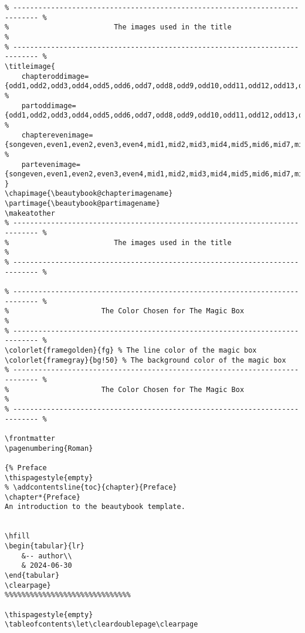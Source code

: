 \documentclass[lang=en,12pt]{beautybook}
\begin{document}
\begin{lstlisting}
% ---------------------------------------------------------------------------- %
%                         The images used in the title                         %
% ---------------------------------------------------------------------------- %
\titleimage{
    chapteroddimage={odd1,odd2,odd3,odd4,odd5,odd6,odd7,odd8,odd9,odd10,odd11,odd12,odd13,odd14,odd15,mid1,mid2,mid3,mid4,mid5,mid6,mid7,mid8,mid9,mid10,mid11},
%
    partoddimage={odd1,odd2,odd3,odd4,odd5,odd6,odd7,odd8,odd9,odd10,odd11,odd12,odd13,odd14,odd15,mid1,mid2,mid3,mid4,mid5,mid6,mid7,mid8,mid9,mid10,mid11},
%
    chapterevenimage={songeven,even1,even2,even3,even4,mid1,mid2,mid3,mid4,mid5,mid6,mid7,mid8,mid9,mid10,mid11},
%
    partevenimage={songeven,even1,even2,even3,even4,mid1,mid2,mid3,mid4,mid5,mid6,mid7,mid8,mid9,mid10,mid11},
}
\chapimage{\beautybook@chapterimagename}
\partimage{\beautybook@partimagename}
\makeatother
% ---------------------------------------------------------------------------- %
%                         The images used in the title                         %
% ---------------------------------------------------------------------------- %

% ---------------------------------------------------------------------------- %
%                      The Color Chosen for The Magic Box                      %
% ---------------------------------------------------------------------------- %
\colorlet{framegolden}{fg} % The line color of the magic box
\colorlet{framegray}{bg!50} % The background color of the magic box
% ---------------------------------------------------------------------------- %
%                      The Color Chosen for The Magic Box                      %
% ---------------------------------------------------------------------------- %

\frontmatter
\pagenumbering{Roman}

{% Preface
\thispagestyle{empty}
% \addcontentsline{toc}{chapter}{Preface}
\chapter*{Preface}
An introduction to the beautybook template.


\hfill
\begin{tabular}{lr}
    &-- author\\ 
    & 2024-06-30
\end{tabular}
\clearpage}
%%%%%%%%%%%%%%%%%%%%%%%%%%%%%%

\thispagestyle{empty}
\tableofcontents\let\cleardoublepage\clearpage



\end{lstlisting}
\end{document}
